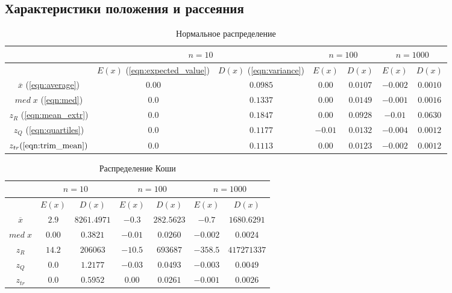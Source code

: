 \documentclass[12pt,a4paper]{article}
\begin{document}
	\subsection{Характеристики положения и рассеяния}
	\begin{center}
		\begin{table}[h]
			\caption{Нормальное распределение}
			\begin{center}
				\begin{tabular}{|c|c|c|c|c|c|c|}
					\hline
					& \multicolumn{2}{c|}{$n=10$} & \multicolumn{2}{c|}{$n=100$} & \multicolumn{2}{c|}{$n=1000$}\\
					\hline
					 & $E(x)$ (\ref{eqn:expected_value}) & $D(x)$ (\ref{eqn:variance}) & $E(x)$ & $D(x)$ & $E(x)$ & $D(x)$\\
					\hline
					$\overline{x}$ (\ref{eqn:average}) & $0.00$ & $0.0985$ & $0.00$ & $0.0107$ & $-0.002$ & $0.0010$\\
					\hline
					$med\;x$ (\ref{eqn:med}) & $0.0$ & $0.1337$ & $0.00$ & $0.0149$ & $-0.001$ & $0.0016$\\
					\hline
					$z_R$ (\ref{eqn:mean_extr}) & $0.0$ & $0.1847$ & $0.00$ & $0.0928$ & $-0.01$ & $0.0630$\\
					\hline
					$z_Q$ (\ref{eqn:quartiles}) & $0.0$ & $0.1177$ & $-0.01$ & $0.0132$ & $-0.004$ & $0.0012$\\
					\hline
					$z_{tr} (\ref{eqn:trim_mean}) $ & $0.0$ & $0.1113$ & $0.00$ & $0.0123$ & $-0.002$ & $0.0012$\\
					\hline
				\end{tabular}
			\end{center}
		\end{table}
	
		\begin{table}[h]
			\caption{Распределение Коши}
			\begin{center}
				\begin{tabular}{|c|c|c|c|c|c|c|}
					\hline
					& \multicolumn{2}{c|}{$n=10$} & \multicolumn{2}{c|}{$n=100$} & \multicolumn{2}{c|}{$n=1000$}\\
					\hline
					& $E(x)$ & $D(x)$ & $E(x)$ & $D(x)$ & $E(x)$ & $D(x)$\\
					\hline
					$\overline{x}$ & $2.9$ & $8261.4971$ & $-0.3$ & $282.5623$ & $-0.7$ & $1680.6291$\\
					\hline
					$med\;x$ & $0.00$ & $0.3821$ & $-0.01$ & $0.0260$ & $-0.002$ & $0.0024$\\
					\hline
					$z_R$ & $14.2$ & $206063$ & $-10.5$ & $693687$ & $-358.5$ & $417271337$\\
					\hline
					$z_Q$ & $0.0$ & $1.2177$ & $-0.03$ & $0.0493$ & $-0.003$ & $0.0049$\\
					\hline
					$z_{tr}$ & $0.0$ & $0.5952$ & $0.00$ & $0.0261$ & $-0.001$ & $0.0026$\\
					\hline
				\end{tabular}
			\end{center}
		\end{table}
	

\end{center}
\end{document}
